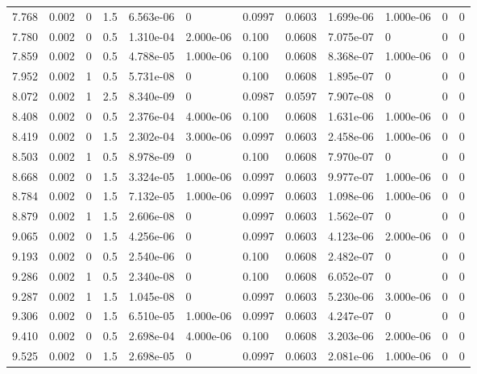 \documentclass[preview]{standalone}
\begin{document}
{{{\begin{tabular}{L{1.2cm}C{1.2cm} C{0.3cm}C{0.5cm} C{1.4cm}C{1.4cm} C{1.4cm}C{1.4cm} C{1.6cm}C{1.6cm} C{1.6cm}C{1.6cm}}
  7.768  &  0.002  & 0     & 1.5 &  6.563e-06  & 0  &  0.0997&   0.0603& 1.699e-06 & 1.000e-06   &  0 & 0  \\ 
  7.780  &  0.002  & 0     & 0.5 &  1.310e-04  & 2.000e-06  &  0.100&   0.0608& 7.075e-07 & 0   &  0 & 0  \\ 
  7.859  &  0.002  & 0     & 0.5 &  4.788e-05  & 1.000e-06  &  0.100&   0.0608& 8.368e-07 & 1.000e-06   &  0 & 0  \\ 
  7.952  &  0.002  & 1     & 0.5 &  5.731e-08  & 0  &  0.100&   0.0608& 1.895e-07 & 0   &  0 & 0  \\ 
  8.072  &  0.002  & 1     & 2.5 &  8.340e-09  & 0  &  0.0987&   0.0597& 7.907e-08 & 0   &  0 & 0  \\ 
  8.408  &  0.002  & 0     & 0.5 &  2.376e-04  & 4.000e-06  &  0.100&   0.0608& 1.631e-06 & 1.000e-06   &  0 & 0  \\ 
  8.419  &  0.002  & 0     & 1.5 &  2.302e-04  & 3.000e-06  &  0.0997&   0.0603& 2.458e-06 & 1.000e-06   &  0 & 0  \\ 
  8.503  &  0.002  & 1     & 0.5 &  8.978e-09  & 0  &  0.100&   0.0608& 7.970e-07 & 0   &  0 & 0  \\ 
  8.668  &  0.002  & 0     & 1.5 &  3.324e-05  & 1.000e-06  &  0.0997&   0.0603& 9.977e-07 & 1.000e-06   &  0 & 0  \\ 
  8.784  &  0.002  & 0     & 1.5 &  7.132e-05  & 1.000e-06  &  0.0997&   0.0603& 1.098e-06 & 1.000e-06   &  0 & 0  \\ 
  8.879  &  0.002  & 1     & 1.5 &  2.606e-08  & 0  &  0.0997&   0.0603& 1.562e-07 & 0   &  0 & 0  \\ 
  9.065  &  0.002  & 0     & 1.5 &  4.256e-06  & 0  &  0.0997&   0.0603& 4.123e-06 & 2.000e-06   &  0 & 0  \\ 
  9.193  &  0.002  & 0     & 0.5 &  2.540e-06  & 0  &  0.100&   0.0608& 2.482e-07 & 0   &  0 & 0  \\ 
  9.286  &  0.002  & 1     & 0.5 &  2.340e-08  & 0  &  0.100&   0.0608& 6.052e-07 & 0   &  0 & 0  \\ 
  9.287  &  0.002  & 1     & 1.5 &  1.045e-08  & 0  &  0.0997&   0.0603& 5.230e-06 & 3.000e-06   &  0 & 0  \\ 
  9.306  &  0.002  & 0     & 1.5 &  6.510e-05  & 1.000e-06  &  0.0997&   0.0603& 4.247e-07 & 0   &  0 & 0  \\ 
  9.410  &  0.002  & 0     & 0.5 &  2.698e-04  & 4.000e-06  &  0.100&   0.0608& 3.203e-06 & 2.000e-06   &  0 & 0  \\ 
  9.525  &  0.002  & 0     & 1.5 &  2.698e-05  & 0  &  0.0997&   0.0603& 2.081e-06 & 1.000e-06   &  0 & 0  \\ 

\end{tabular}}}}
\end{document}
